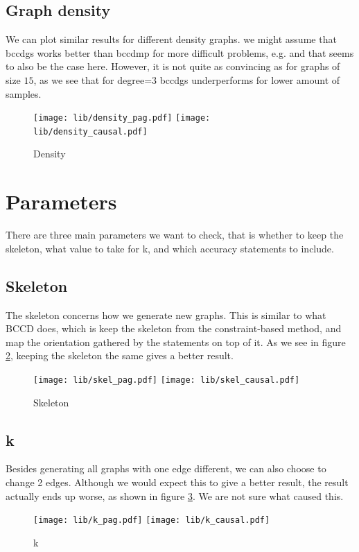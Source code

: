 \documentclass[11pt,a4paper]{report}
\theoremstyle{definition}
\begin{document}
\subsection{Graph density}
We can plot similar results for different density graphs. we
might assume that bccdgs works better than bccdmp for more difficult
problems, e.g. and that seems to also be the case here. However, it is not
quite as convincing as for graphs of size $15$, as we see that for
degree=3 bccdgs underperforms for lower amount of samples.
\begin{figure}
  \centering
  \texttt{[image: lib/density\_pag.pdf]}
  \texttt{[image: lib/density\_causal.pdf]}
  \caption{Density}
  \label{fig:density_causal}
\end{figure}

\section{Parameters}
There are three main parameters we want to check, that is whether to keep
the skeleton, what value to take for k, and which accuracy statements to
include.

\subsection{Skeleton}
The skeleton concerns how we generate new graphs. This is similar to what
BCCD does, which is keep the skeleton from the constraint-based method,
and map the orientation gathered by the statements on top of it. As we see
in figure \ref{fig:skel_causal}, keeping the skeleton the same gives a
better result.
\begin{figure}
  \centering
  \texttt{[image: lib/skel\_pag.pdf]}
  \texttt{[image: lib/skel\_causal.pdf]}
  \caption{Skeleton}
  \label{fig:skel_causal}
\end{figure}

\subsection{k}
Besides generating all graphs with one edge different, we can also choose
to change 2 edges. Although we would expect this to give a better result,
the result actually ends up worse, as shown in figure \ref{fig:k_causal}.
We are not sure what caused this.
\begin{figure}
  \centering
  \texttt{[image: lib/k\_pag.pdf]}
  \texttt{[image: lib/k\_causal.pdf]}
  \caption{k}
  \label{fig:k_causal}
\end{figure}
\end{document}

